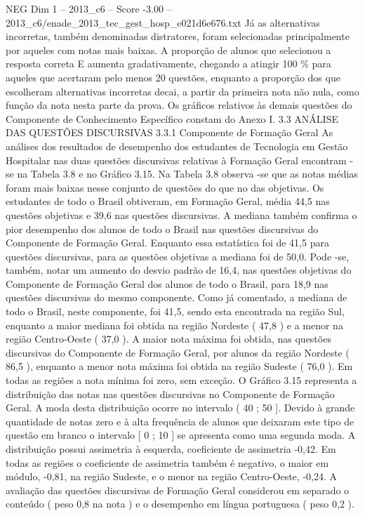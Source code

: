 \begin{textsample}{NEG Dim 1 – 2013\_c6 – Score -3.00 – 2013\_c6/enade\_2013\_tec\_gest\_hosp\_e021d6e676.txt}
Já as alternativas incorretas, também denominadas distratores, foram selecionadas principalmente por aqueles com notas mais baixas.
A proporção de alunos que selecionou a resposta correta E aumenta gradativamente, chegando a atingir 100 \% para aqueles que acertaram pelo menos 20 questões, enquanto a proporção dos que escolheram alternativas incorretas decai, a partir da primeira nota não nula, como função da nota nesta parte da prova.
Os gráficos relativos às demais questões do Componente de Conhecimento Específico constam do Anexo I. 3.3 ANÁLISE DAS QUESTÕES DISCURSIVAS 3.3.1 Componente de Formação Geral As análises dos resultados de desempenho dos estudantes de Tecnologia em Gestão Hospitalar nas duas questões discursivas relativas à Formação Geral encontram -se na Tabela 3.8 e no Gráfico 3.15.
Na Tabela 3.8 observa -se que as notas médias foram mais baixas nesse conjunto de questões do que no das objetivas.
Os estudantes de todo o Brasil obtiveram, em Formação Geral, média 44,5 nas questões objetivas e 39,6 nas questões discursivas.
A mediana também confirma o pior desempenho dos alunos de todo o Brasil nas questões discursivas do Componente de Formação Geral.
Enquanto essa estatística foi de 41,5 para questões discursivas, para as questões objetivas a mediana foi de 50,0.
Pode -se, também, notar um aumento do desvio padrão de 16,4, nas questões objetivas do Componente de Formação Geral dos alunos de todo o Brasil, para 18,9 nas questões discursivas do mesmo componente.
Como já comentado, a mediana de todo o Brasil, neste componente, foi 41,5, sendo esta encontrada na região Sul, enquanto a maior mediana foi obtida na região Nordeste ( 47,8 ) e a menor na região Centro-Oeste ( 37,0 ).
A maior nota máxima foi obtida, nas questões discursivas do Componente de Formação Geral, por alunos da região Nordeste ( 86,5 ), enquanto a menor nota máxima foi obtida na região Sudeste ( 76,0 ).
Em todas as regiões a nota mínima foi zero, sem exceção.
O Gráfico 3.15 representa a distribuição das notas nas questões discursivas no Componente de Formação Geral.
A moda desta distribuição ocorre no intervalo ( 40 ; 50 ].
Devido à grande quantidade de notas zero e à alta frequência de alunos que deixaram este tipo de questão em branco o intervalo [ 0 ; 10 ] se apresenta como uma segunda moda.
A distribuição possui assimetria à esquerda, coeficiente de assimetria -0,42.
Em todas as regiões o coeficiente de assimetria também é negativo, o maior em módulo, -0,81, na região Sudeste, e o menor na região Centro-Oeste, -0,24.
A avaliação das questões discursivas de Formação Geral considerou em separado o conteúdo ( peso 0,8 na nota ) e o desempenho em língua portuguesa ( peso 0,2 ).

\end{textsample}
